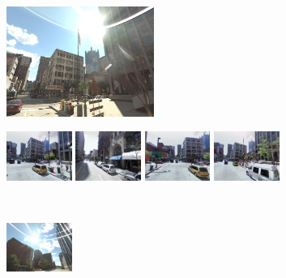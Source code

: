 \documentclass[table]{article} %
\begin{document}
\begin{figure}
\begin{minipage}{0.75\linewidth}
\begin{minipage}{\linewidth}
            \end{minipage} 
        \end{minipage}
        \vspace{3mm}
        \\
        \begin{minipage}{0.34\linewidth}
            \centering
            \vspace{0mm}
            \includegraphics[height=36mm]{imgs/ex3/query}
        \end{minipage}
        \begin{minipage}{0.75\linewidth}
            \begin{minipage}{\linewidth} 
                \colorbox{myGreen}{\includegraphics[height=16mm]{imgs/ex3/FVsvm1}}
                \colorbox{myRed}{\includegraphics[height=16mm]{imgs/ex3/FVsvm2}}
                \colorbox{myGreen}{\includegraphics[height=16mm]{imgs/ex3/FVsvm5}}
                \colorbox{myGreen}{\includegraphics[height=16mm]{imgs/ex3/FVsvm4}}
            \end{minipage}
            \\
            \begin{minipage}{\linewidth}
                \colorbox{myRed}{\includegraphics[height=16mm]{imgs/ex3/FV1}}

\end{minipage}
\end{minipage}
\end{figure}
\end{document}
